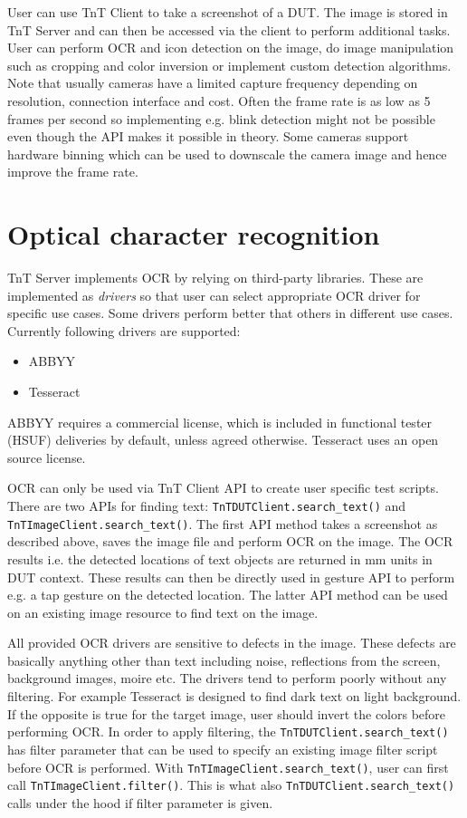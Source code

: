 User can use TnT Client to take a screenshot of a DUT. The image is stored in TnT Server and can then be accessed via the client to perform additional tasks. User can perform OCR and icon detection on the image, do image manipulation such as cropping and color inversion or implement custom detection algorithms. Note that usually cameras have a limited capture frequency depending on resolution, connection interface and cost. Often the frame rate is as low as 5 frames per second so implementing e.g. blink detection might not be possible even though the API makes it possible in theory. Some cameras support hardware binning which can be used to downscale the camera image and hence improve the frame rate.

\section{Optical character recognition}
TnT Server implements OCR by relying on third-party libraries. These are implemented as \emph{drivers} so that user
can select appropriate OCR driver for specific use cases. Some drivers perform better that others in different use cases.
Currently following drivers are supported:
%
\begin{itemize}
\item ABBYY
\item Tesseract
\end{itemize}

ABBYY requires a commercial license, which is included in functional tester (HSUF) deliveries by default, unless agreed otherwise. Tesseract uses an open source license.

OCR can only be used via TnT Client API to create user specific test scripts. There are two APIs for finding text: \texttt{TnTDUTClient.search{\_}text()} and \texttt{TnTImageClient.search{\_}text()}. The first API method takes a screenshot as described above, saves the image file and perform OCR on the image. The OCR results i.e. the detected locations of text objects are returned in mm units in DUT context. These results can then be directly used in gesture API to perform e.g. a tap gesture on the detected location. The latter API method can be used on an existing image resource to find text on the image.

All provided OCR drivers are sensitive to defects in the image. These defects are basically anything other than text including
noise, reflections from the screen, background images, moire etc. The drivers tend to perform poorly without any filtering.
For example Tesseract is designed to find dark text on light background. If the opposite is true for the target image, user should invert the colors before performing OCR. In order to apply filtering, the \texttt{TnTDUTClient.search{\_}text()} has filter parameter that
can be used to specify an existing image filter script before OCR is performed. With \texttt{TnTImageClient.search{\_}text()}, user can
first call \texttt{TnTImageClient.filter()}. This is what also \texttt{TnTDUTClient.search{\_}text()} calls under the hood if filter parameter is given.

